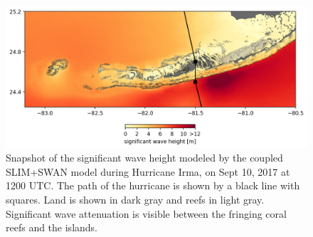 \begin{figure}
    \centering
    \includegraphics[width=\textwidth]{chapters/conclusions/figures/swh_figure.png}
    \caption{Snapshot of the significant wave height modeled by the coupled SLIM+SWAN model during Hurricane Irma, on Sept 10, 2017 at 1200 UTC. The path of the hurricane is shown by a black line with squares. Land is shown in dark gray and reefs in light gray. Significant wave attenuation is visible between the fringing coral reefs and the islands.}
    \label{ccl:swh}
\end{figure}
